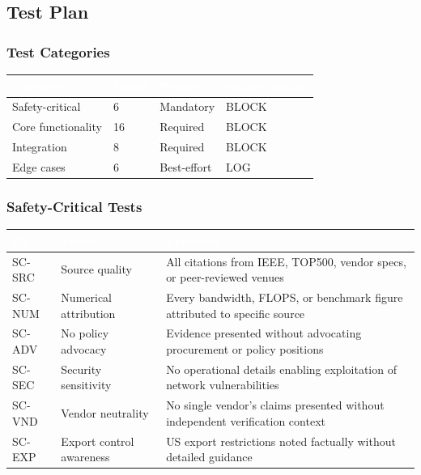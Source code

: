 \documentclass[11pt,letterpaper]{article}
\newcommand{\tableheader}[1]{\textbf{\sffamily\textcolor{white}{#1}}}
\begin{document}
\subsection{Test Plan}

\subsubsection{Test Categories}

\begin{center}
\begin{tabularx}{\textwidth}{L{3cm}C{1.5cm}C{1.5cm}X}
\toprule
{}
\tableheader{Category} & \tableheader{Count} & \tableheader{Priority} & \tableheader{Failure Action} \\
\midrule
Safety-critical & 6 & Mandatory & BLOCK \\
Core functionality & 16 & Required & BLOCK \\
Integration & 8 & Required & BLOCK \\
Edge cases & 6 & Best-effort & LOG \\
\bottomrule
\end{tabularx}
\end{center}

\subsubsection{Safety-Critical Tests}

\begin{center}
\begin{tabularx}{\textwidth}{C{1.2cm}L{4cm}X}
\toprule
{}
\tableheader{ID} & \tableheader{Verifies} & \tableheader{Expected} \\
\midrule
SC-SRC & Source quality & All citations from IEEE, TOP500, vendor specs, or peer-reviewed venues \\
SC-NUM & Numerical attribution & Every bandwidth, FLOPS, or benchmark figure attributed to specific source \\
SC-ADV & No policy advocacy & Evidence presented without advocating procurement or policy positions \\
SC-SEC & Security sensitivity & No operational details enabling exploitation of network vulnerabilities \\
SC-VND & Vendor neutrality & No single vendor's claims presented without independent verification context \\
SC-EXP & Export control awareness & US export restrictions noted factually without detailed guidance \\
\bottomrule
\end{tabularx}
\end{center}
\end{document}
